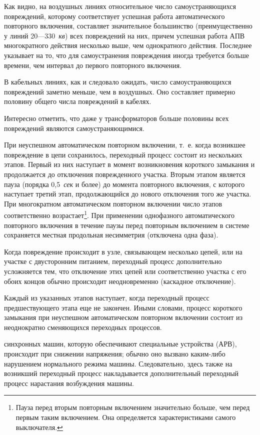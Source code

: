 Как видно, на воздушных линиях относительное число самоустраняющихся повреждений, которому соответствует успешная работа автоматического повторного включения, составляет значительное большинство (преимущественно у линий 20—330~\textit{кв}) всех повреждений на них, причем успешная работа АПВ многократного действия несколько выше, чем однократного действия. Последнее указывает на то, что для самоустранения повреждения иногда требуется больше времени, чем интервал до первого повторного включения.

В кабельных линиях, как и следовало ожидать, число самоустраняющихся повреждений заметно меньше, чем в воздушных. Оно составляет примерно половину общего числа повреждений в кабелях.

Интересно отметить, что даже у трансформаторов больше половины всех повреждений являются самоустраняющимися.

При неуспешном автоматическом повторном включении, т.~е. когда возникшее повреждение в цепи сохранилось, переходный процесс состоит из нескольких этапов. Первый из них наступает в момент возникновения короткого замыкания и продолжается до отключения поврежденного участка. Вторым этапом является пауза (порядка 0,5~\textit{сек} и более) до момента повторного включения, с которого наступает третий этап, продолжающийся до нового отключения того же участка. При многократном автоматическом повторном включении число этапов соответственно возрастает\footnote{Пауза перед вторым повторным включением значительно больше, чем перед первым таким включением. Она определяется характеристиками самого выключателя.}. При применении однофазного автоматического повторного включения в течение паузы перед повторным включением в системе сохраняется местная продольная несимметрия (отключена одна фаза).

Когда повреждение происходит в узле, связывающем несколько цепей, или на участке с двусторонним питанием, переходный процесс дополнительно усложняется тем, что отключение этих цепей или соответственно участка с его обоих концов обычно происходит неодновременно (каскадное отключение).

Каждый из указанных этапов наступает, когда переходный процесс предшествующего этапа еще не закончен. Иными словами, процесс короткого замыкания при неуспешном автоматическом повторном включении состоит из неоднократно сменяющихся переходных процессов.

 синхронных машин, которую обеспечивают специальные устройства  (АРВ), происходит при снижении напряжения; обычно оно вызвано каким-либо нарушением нормального режима машины. Следовательно, здесь также на возникший переходный процесс накладывается дополнительный переходный процесс нарастания возбуждения машины.

